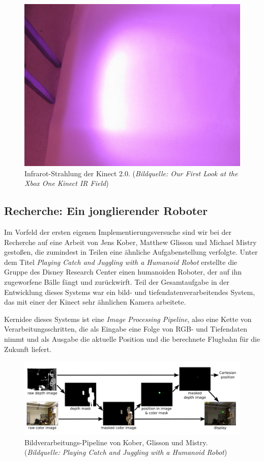 \documentclass[12pt,a4paper,ngerman]{scrartcl}
\begin{document}
\begin{figure}[H]
    \centering
    \includegraphics[scale=0.33]{img/kinect2_infrared.jpg}
    \caption{Infrarot-Strahlung der Kinect 2.0. ({\em Bildquelle: Our First Look at the Xbox One Kinect IR Field\cite{kinect2:infrared}})}
\end{figure}

\subsection{Recherche: Ein jonglierender Roboter}

Im Vorfeld der ersten eigenen Implementierungsversuche sind wir bei der
Recherche auf eine Arbeit von Jens Kober, Matthew Glisson und Michael Mistry
gestoßen, die zumindest in Teilen eine ähnliche Aufgabenstellung verfolgte.
Unter dem Titel {\em Playing Catch and Juggling with a Humanoid Robot}\cite{kober}
erstellte die Gruppe des Disney Research Center\cite{disneyresearch} einen
humanoiden Roboter, der auf ihn zugeworfene Bälle fängt und zurückwirft.
Teil der Gesamtaufgabe in der Entwicklung dieses Systems war ein
bild- und tiefendatenverarbeitendes System, das mit einer der Kinect sehr ähnlichen
Kamera arbeitete.

Kernidee dieses Systems ist eine \textit{Image Processing Pipeline}, also eine
Kette von Verarbeitungsschritten, die als Eingabe eine Folge von RGB- und Tiefendaten
nimmt und als Ausgabe die aktuelle Position und die berechnete Flugbahn für die Zukunft liefert.

\begin{figure}[H]
    \centering
    \includegraphics[scale=0.31]{img/koberpipeline.jpg}
    \caption{Bildverarbeitungs-Pipeline von Kober, Glisson und Mistry. ({\em Bildquelle: Playing Catch and Juggling with a Humanoid Robot\cite{kober}})}
    \label{koberpipeline}
\end{figure}
\end{document}
